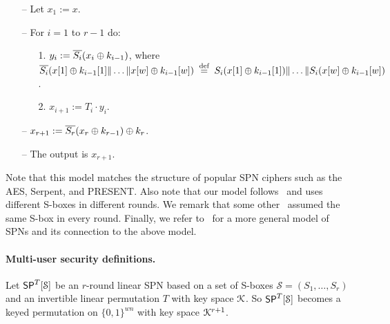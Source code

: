 \begin{itemize}
  \item[--]
  Let $x_1 := x$.
  \item[--]
  For $i = 1$ to $r-1$ do:
  \begin{itemize}
  	\item[1.] $y_{i} := \overline{S_i}(x_{i}\oplus k_{i-1})$, where $\overline{S_i}(x[1]\oplus k_{i-1}[1]\|\ldots\| x[w]\oplus k_{i-1}[w]) \stackrel{\text { def }}{=} S_i(x[1]\oplus k_{i-1}[1])\|\ldots\| S_i(x[w]\oplus k_{i-1}[w])$.
    \item[2.] 
    $x_{i + 1} := T_i\cdot y_i$.
  \end{itemize}
  \item[--] $x_{r+1} := \overline{S_r}(x_r\oplus k_{r-1})\oplus k_r$.
  \item[--]
  The output is $x_{r+1}$.
\end{itemize}

Note that this model matches the structure of popular SPN ciphers such as the AES, Serpent, and PRESENT. Also note that our model follows~\cite[Sect. 4.2]{C:CDKLST18} and uses different S-boxes in different rounds. We remark that some other~\cite[Sect. 3]{C:CDKLST18} assumed the same S-box in every round. Finally, we refer to~\cite[Sect. 2.1]{EPRINT:DKSTZ17} for a more general model of SPNs and its connection to the above model.











%

\paragraph{Multi-user security definitions.}


Let $\mathsf{SP}^T[\mathcal{S}]$ be an $r$-round linear SPN based on a set of S-boxes $\mathcal{S}=(S_1, \ldots  ,S_r)$ and an invertible linear permutation $T$ with key space $\mathcal{K}$. So $\mathsf{SP}^T[\mathcal{S}]$
becomes a keyed permutation on $\{0, 1\}^{wn}$ with key space $\mathcal{K}^{r+1}$.


